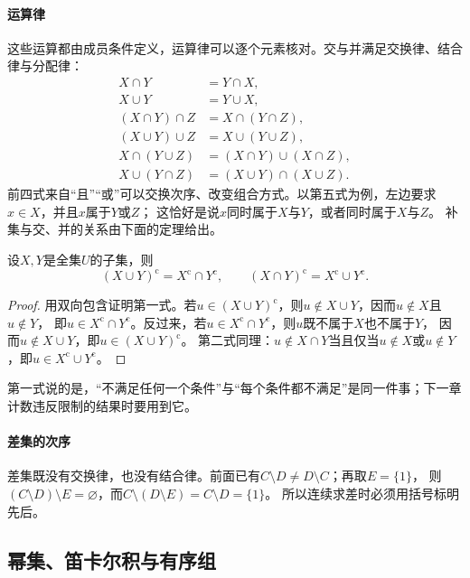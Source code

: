 \paragraph{运算律}
这些运算都由成员条件定义，运算律可以逐个元素核对。交与并满足交换律、结合律与分配律：
\begin{align*}
 X\cap Y&=Y\cap X,\\
 X\cup Y&=Y\cup X,\\
 (X\cap Y)\cap Z&=X\cap(Y\cap Z),\\
 (X\cup Y)\cup Z&=X\cup(Y\cup Z),\\
 X\cap(Y\cup Z)&=(X\cap Y)\cup(X\cap Z),\\
 X\cup(Y\cap Z)&=(X\cup Y)\cap(X\cup Z).
\end{align*}
前四式来自“且”“或”可以交换次序、改变组合方式。以第五式为例，左边要求$x\in X$，并且$x$属于$Y$或$Z$；
这恰好是说$x$同时属于$X$与$Y$，或者同时属于$X$与$Z$。
补集与交、并的关系由下面的定理给出。
\begin{theorem}[De Morgan律]
\label{thm:sets-de-morgan}
设$X,Y$是全集$U$的子集，则
\begin{equation}
 (X\cup Y)^{\mathrm c}=X^{\mathrm c}\cap Y^{\mathrm c},\qquad
 (X\cap Y)^{\mathrm c}=X^{\mathrm c}\cup Y^{\mathrm c}.
 \label{eq:prelim-de-morgan-two-sets}
\end{equation}
\end{theorem}
\begin{proof}
用双向包含证明第一式。若$u\in(X\cup Y)^{\mathrm c}$，则$u\notin X\cup Y$，因而$u\notin X$且$u\notin Y$，
即$u\in X^{\mathrm c}\cap Y^{\mathrm c}$。反过来，若$u\in X^{\mathrm c}\cap Y^{\mathrm c}$，则$u$既不属于$X$也不属于$Y$，
因而$u\notin X\cup Y$，即$u\in(X\cup Y)^{\mathrm c}$。
第二式同理：$u\notin X\cap Y$当且仅当$u\notin X$或$u\notin Y$，即$u\in X^{\mathrm c}\cup Y^{\mathrm c}$。
\end{proof}
第一式说的是，“不满足任何一个条件”与“每个条件都不满足”是同一件事；下一章计数违反限制的结果时要用到它。

\paragraph{差集的次序}
差集既没有交换律，也没有结合律。前面已有$C\setminus D\neq D\setminus C$；再取$E=\{1\}$，
则$(C\setminus D)\setminus E=\varnothing$，而$C\setminus(D\setminus E)=C\setminus D=\{1\}$。
所以连续求差时必须用括号标明先后。

\subsection{幂集、笛卡尔积与有序组}
\label{sec:sets-power-sets-products}

